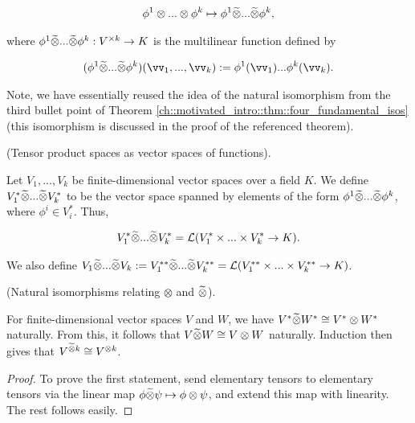 \begin{deriv}
    \begin{align*}
        \phi^1 \otimes ... \otimes \phi^k \mapsto \phi^1 \widetilde{\otimes} ... \widetilde{\otimes} \phi^k,
    \end{align*}
    
    where $\phi^1 \widetilde{\otimes} ... \widetilde{\otimes} \phi^k:V^{\times k} \rightarrow K$ is the multilinear function defined by
    
    \begin{align*}
        (\phi^1 \totimes ... \totimes \phi^k)(\vv_1, ..., \vv_k) := \phi^1(\vv_1) ... \phi^k(\vv_k).
    \end{align*}
    
    Note, we have essentially reused the idea of the natural isomorphism from the third bullet point of Theorem \ref{ch::motivated_intro::thm::four_fundamental_isos} (this isomorphism is discussed in the proof of the referenced theorem).
\end{deriv}

\begin{defn}
    (Tensor product spaces as vector spaces of functions).
    
    Let $V_1, ..., V_k$ be finite-dimensional vector spaces over a field $K$. We define $V_1^* \widetilde{\otimes} ... \widetilde{\otimes} V_k^*$ to be the vector space spanned by elements of the form $\phi^1 \widetilde{\otimes} ... \widetilde{\otimes} \phi^k$, where $\phi^i \in V_i^*$. Thus, 
    
    \begin{align*}
        V_1^* \widetilde{\otimes} ... \widetilde{\otimes} V_k^* = \mathcal{L}(V_1^* \times ... \times V_k^* \rightarrow K).
    \end{align*}
    
    We also define $V_1 \widetilde{\otimes} ... \widetilde{\otimes} V_k := V_1^{**} \widetilde{\otimes} ... \widetilde{\otimes} V_k^{**} = \mathcal{L}(V_1^{**} \times ... \times V_k^{**} \rightarrow K)$.
\end{defn}

\begin{theorem}
    (Natural isomorphisms relating $\otimes$ and $\widetilde{\otimes}$).
     
    For finite-dimensional vector spaces $V$ and $W$, we have $V^* \widetilde{\otimes} W^* \cong V^* \otimes W^*$ naturally. From this, it follows that $V \widetilde{\otimes} W \cong V \otimes W$ naturally. Induction then gives that $V^{\widetilde{\otimes} k} \cong V^{\otimes k}$.
\end{theorem}

\begin{proof}
    To prove the first statement, send elementary tensors to elementary tensors via the linear map $\phi \widetilde{\otimes} \psi \mapsto \phi \otimes \psi$, and extend this map with linearity. The rest follows easily.
\end{proof}

